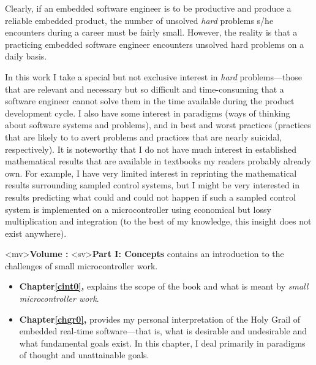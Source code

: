 Clearly, if an embedded software engineer is to be productive and
produce a reliable embedded product, the number of unsolved
\emph{hard} problems s/he encounters during a career must
be fairly small.  However, the reality is that a practicing
embedded software engineer encounters unsolved hard problems
on a daily basis.

In this work I take a special but not exclusive interest in
\emph{hard} problems---those that are relevant and necessary
but
so difficult and time-consuming that a software engineer cannot
solve them in the time available during the product development
cycle.  I also have some interest in paradigms (ways of
thinking about software systems and problems), and in
best and worst practices (practices that are likely to to
avert problems and practices that are nearly suicidal,
respectively).  It is noteworthy that I do not
have much interest in established
mathematical results that are available in
textbooks my readers probably already own.
For example, I have very limited interest in
reprinting the mathematical results surrounding
sampled control systems, but
I might be very interested in results predicting what
could and could not happen if such a
sampled control system is implemented on
a microcontroller using economical but lossy
multiplication and integration (to the best of my
knowledge, this insight does not exist anywhere).

<mv>\textbf{Volume \vconzeroroman{}: \vconzerotitle{}}
<sv>\textbf{Part I:  Concepts}
contains an introduction to the challenges of small microcontroller work.
\begin{itemize}
\item \textbf{Chapter\;\ref{cint0}, \cintzerotitle{}} explains the scope of the book 
      and what is meant by \emph{small microcontroller work}.
\item \textbf{Chapter\;\ref{chgr0}, \chgrzerotitle{}} provides my personal 
      interpretation of the
      Holy Grail of embedded real-time software---that is, what is
      desirable and undesirable and what fundamental goals
      exist.  In this chapter, I deal primarily in paradigms of
      thought and
      unattainable goals.
\end{itemize}


